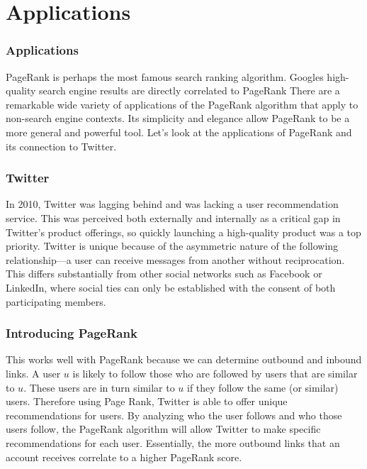 \documentclass{beamer}
\begin{document}
\section{Applications}
\begin{frame}[t]
    \frametitle{Applications}
    \begin{outline}
        \1 PageRank is perhaps the most famous search ranking algorithm. Googles high-quality search engine results are directly correlated to PageRank
        \1 There are a remarkable wide variety of applications of the PageRank algorithm that apply to non-search engine contexts.
        \1 Its simplicity and elegance allow PageRank to be a more general and powerful tool.
        \1 Let's look at the applications of PageRank and its connection to Twitter.

    \end{outline}
\end{frame}

\begin{frame}[t]
    \frametitle{Twitter}
    \begin{outline}
        \1 In 2010, Twitter was lagging behind and was lacking a user recommendation service. 
        \1 This was perceived both externally and internally as a critical gap in Twitter’s product offerings, so quickly launching a high-quality product was a top priority.
        \1 Twitter is unique because of the asymmetric nature of the following relationship—a user can receive messages from another without reciprocation. 
        \1 This differs substantially from other social networks such as Facebook or LinkedIn, where social ties can only be established with the consent of both participating members.
    \end{outline}
\end{frame}

\begin{frame}[t]
    \frametitle{Introducing PageRank}
    \begin{outline}
        \1 This works well with PageRank because we can determine outbound and inbound links.
        \1 A user $u$ is likely to follow those who are followed by users that are similar to $u$. 
        \1 These users are in turn similar to $u$ if they follow the same (or similar) users.
        \1 Therefore using Page Rank, Twitter is able to offer unique recommendations for users. 
        \1 By analyzing who the user follows and who those users follow, the PageRank algorithm will allow Twitter to make specific recommendations for each user. 
        \1 Essentially, the more outbound links that an account receives correlate to a higher PageRank score.        
    \end{outline}
\end{frame}
\end{document}
